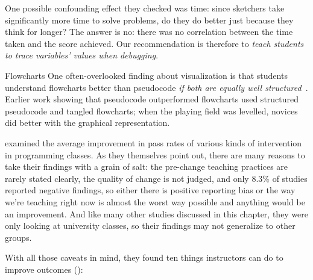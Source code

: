 One possible confounding effect they checked was time: since sketchers
take significantly more time to solve problems, do they do better just
because they think for longer? The answer is no: there was no
correlation between the time taken and the score achieved. Our
recommendation is therefore to \emph{teach students to trace variables'
values when debugging}.

\begin{aside}{Flowcharts}
  One often-overlooked finding about visualization is that students
  understand flowcharts better than pseudocode \emph{if both are equally well
    structured}~\cite{Scan1989}. Earlier work showing that pseudocode
  outperformed flowcharts used structured pseudocode and tangled
  flowcharts; when the playing field was levelled, novices did better
  with the graphical representation.
\end{aside}


\cite{Viha2014} examined the average improvement in pass rates of
various kinds of intervention in programming classes. As they themselves
point out, there are many reasons to take their findings with a grain of
salt: the pre-change teaching practices are rarely stated clearly, the
quality of change is not judged, and only 8.3\% of studies reported
negative findings, so either there is positive reporting bias or the way
we're teaching right now is almost the worst way possible and anything
would be an improvement. And like many other studies discussed in this
chapter, they were only looking at university classes, so their findings
may not generalize to other groups.

With all those caveats in mind, they found ten things instructors can do
to improve outcomes ():

